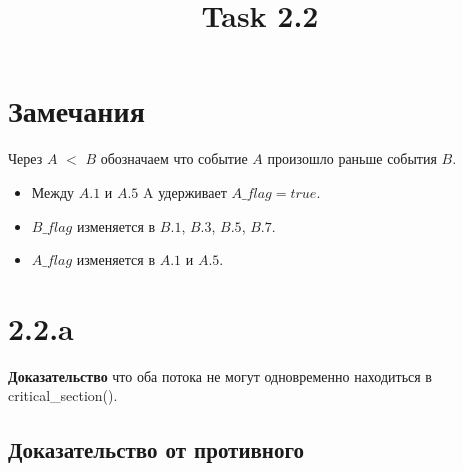 \documentclass[a4paper,12pt]{article}
\title{Task 2.2}
\begin{document}
\section*{Замечания}
Через $A$ $<$ $B$ обозначаем что событие $A$ произошло раньше события $B$.

\begin{itemize}
\item Между $A.1$ и $A.5$ A удерживает $A\_flag = true$.
\item $B\_flag$ изменяется в $B.1$, $B.3$, $B.5$, $B.7$.
\item $A\_flag$ изменяется в $A.1$ и $A.5$.
\end{itemize}

\section*{2.2.a}

\textbf{Доказательство} что оба потока не могут одновременно находиться в critical\_section().

\subsection*{Доказательство от противного}
\end{document}
